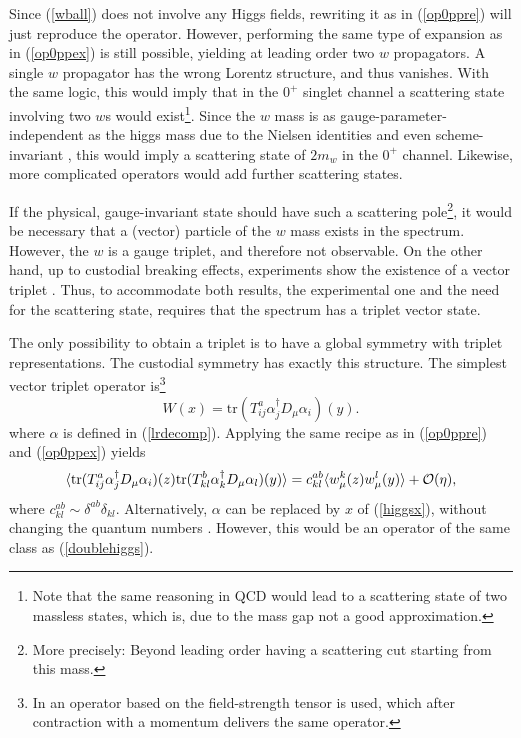 \documentclass[final,12pt,3p,longtitle]{elsarticle}
\newcommand*{\no}{\noindent}
\newcommand*{\be}{\begin{equation}}
\newcommand*{\ee}{\end{equation}}
\newcommand*{\pref}[1]{(\ref{#1})}
\newcommand*{\tr}{\mathrm{tr}}
\newcommand*{\1}{1\!\!\!\bot}
\begin{document}
Since \pref{wball} does not involve any Higgs fields, rewriting it as in \pref{op0ppre} will just reproduce the operator. However, performing the same type of expansion as in \pref{op0ppex} is still possible, yielding at leading order two $w$ propagators. A single $w$ propagator has the wrong Lorentz structure, and thus vanishes. With the same logic, this would imply that in the $0^+$ singlet channel a scattering state involving two $w$s would exist\footnote{Note that the same reasoning in QCD would lead to a scattering state of two massless states, which is, due to the mass gap not a good approximation.}. Since the $w$ mass is as gauge-parameter-independent as the higgs mass due to the Nielsen identities and even scheme-invariant \cite{Bohm:2001yx}, this would imply a scattering state of $2m_w$ in the $0^+$ channel. Likewise, more complicated operators would add further scattering states.

If the physical, gauge-invariant state should have such a scattering pole\footnote{More precisely: Beyond leading order having a scattering cut starting from this mass.}, it would be necessary that a (vector) particle of the $w$ mass exists in the spectrum. However, the $w$ is a gauge triplet, and therefore not observable. On the other hand, up to custodial breaking effects, experiments show the existence of a vector triplet \cite{pdg}. Thus, to accommodate both results, the experimental one and the need for the scattering state, requires that the spectrum has a triplet vector state.

The only possibility to obtain a triplet is to have a global symmetry with triplet representations. The custodial symmetry has exactly this structure. The simplest vector triplet operator is\footnote{In \cite{Frohlich:1980gj,Frohlich:1981yi} an operator based on the field-strength tensor is used, which after contraction with a momentum delivers the same operator.} \cite{'tHooft:1979bj,Evertz:1985fc,Maas:2012tj,Maas:2013aia}
\be
W(x)=\tr\left(T^a_{ij}\alpha_j^\dagger D_\mu\alpha_i\right)(y)\label{op1t}.
\ee
\no where $\alpha$ is defined in \pref{lrdecomp}. Applying the same recipe as in \pref{op0ppre} and \pref{op0ppex} yields
\be
\langle\tr(T^a_{ij}\alpha_j^\dagger D_\mu\alpha_i)(z)\tr(T^b_{kl}\alpha_k^\dagger D_\mu\alpha_l)(y)\rangle=
c^{ab}_{kl}\langle w^k_\mu(z) w^l_\mu(y)\rangle+{\cal O}(\eta)\label{wcor},
\ee
\no where  $c^{ab}_{kl}\sim\delta^{ab}\delta_{kl}$. Alternatively, $\alpha$ can be replaced by $x$ of \pref{higgsx}, without changing the quantum numbers \cite{Evertz:1985fc}. However, this would be an operator of the same class as \pref{doublehiggs}.
\end{document}
